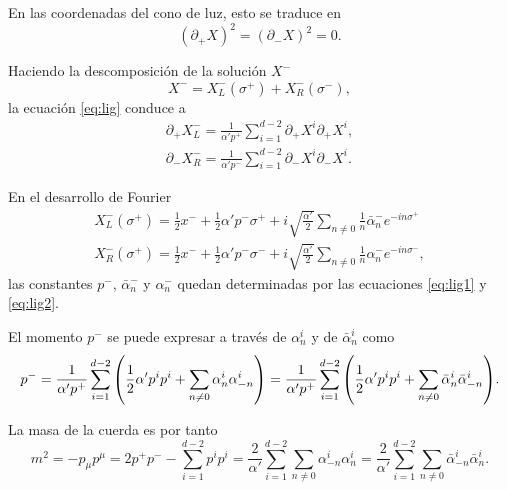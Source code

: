 En las coordenadas del cono de luz, esto se traduce en
\begin{equation}
  (\partial_+ X)^2 = (\partial_- X)^2 = 0.
  \label{eq:lig}
\end{equation}

Haciendo la descomposición de la solución $X^-$ 
\begin{equation}
  X^-=X^-_L(\sigma^+)+X^-_R(\sigma^-),
\end{equation}
la ecuación \ref{eq:lig} conduce a 
  \begin{align}
    \partial_+ X_L^- = \frac{1}{\alpha'p^+}\sum_{i=1}^{d-2} \partial_+ X^i \partial_+ X^i, \label{eq:lig1}\\
    \partial_- X_R^- = \frac{1}{\alpha'p^-}\sum_{i=1}^{d-2} \partial_- X^i \partial_- X^i. \label{eq:lig2}
  \end{align}

En el desarrollo de Fourier
\begin{equation}
  \begin{gathered}
    X^-_L(\sigma^+)=\frac 1 2 x^- + \frac 1 2 \alpha' p^- \sigma^+ + i\sqrt{\frac{ \alpha'}{ 2}}
    \sum_{n\neq0} \frac 1 n \bar{\alpha}^-_n e^{-in\sigma^+} \\                             
    X^-_R(\sigma^+)=\frac 1 2 x^- + \frac 1 2 \alpha' p^- \sigma^- + i\sqrt{\frac{ \alpha'}{ 2}}
    \sum_{n\neq0} \frac 1 n \alpha^-_n e^{-in\sigma^-},
  \end{gathered}
\end{equation}
las constantes $p^-$, $\bar \alpha^-_n$ y $\alpha^-_n$ quedan determinadas por las ecuaciones
\ref{eq:lig1} y \ref{eq:lig2}.

El momento $p^-$ se puede expresar a través de $\alpha^i_n$ y de $\bar \alpha^i_n$ como
\begin{equation}
  p^- = \frac{1}{\alpha' p^+}\sum_{i=1}^{d-2} \qty(\frac{1}{2}\alpha'p^i p^i +\sum_{n\neq0}\alpha_n^i\alpha_{-n}^i) 
   = \frac{1}{\alpha' p^+}\sum_{i=1}^{d-2} \qty(\frac{1}{2}\alpha'p^i p^i +\sum_{n\neq0}\bar \alpha_n^i\bar \alpha_{-n}^i) .
\end{equation}

La masa de la cuerda es por tanto
\begin{equation}
  m^2=-p_\mu p^\mu = 2p^+p^- - \sum_{i=1}^{d-2} p^i p^i = 
  \frac{2}{\alpha'}\sum_{i=1}^{d-2} \sum_{n\neq 0} \alpha_{-n}^i \alpha_n^i
  =\frac{2}{\alpha'}\sum_{i=1}^{d-2} \sum_{n\neq 0}\bar \alpha_{-n}^i \bar\alpha_n^i.
  \label{eq:mass}
\end{equation}

